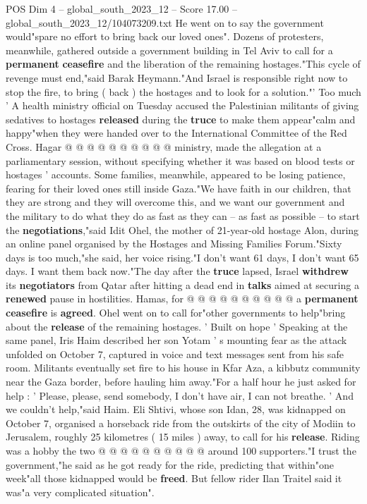 \begin{textsample}{POS Dim 4 – global\_south\_2023\_12 – Score 17.00 – global\_south\_2023\_12/104073209.txt}
He went on to say the government would"spare no effort to bring back our loved ones".
Dozens of protesters, meanwhile, gathered outside a government building in Tel Aviv to call for a \textbf{permanent} \textbf{ceasefire} and the liberation of the remaining hostages."This cycle of revenge must end,"said Barak Heymann."And Israel is responsible right now to stop the fire, to bring ( back ) the hostages and to look for a solution."' Too much ' A health ministry official on Tuesday accused the Palestinian militants of giving sedatives to hostages \textbf{released} during the \textbf{truce} to make them appear"calm and happy"when they were handed over to the International Committee of the Red Cross.
Hagar @ @ @ @ @ @ @ @ @ @ ministry, made the allegation at a parliamentary session, without specifying whether it was based on blood tests or hostages ' accounts.
Some families, meanwhile, appeared to be losing patience, fearing for their loved ones still inside Gaza."We have faith in our children, that they are strong and they will overcome this, and we want our government and the military to do what they do as fast as they can -- as fast as possible -- to start the \textbf{negotiations},"said Idit Ohel, the mother of 21-year-old hostage Alon, during an online panel organised by the Hostages and Missing Families Forum."Sixty days is too much,"she said, her voice rising."I don't want 61 days, I don't want 65 days.
I want them back now."The day after the \textbf{truce} lapsed, Israel \textbf{withdrew} its \textbf{negotiators} from Qatar after hitting a dead end in \textbf{talks} aimed at securing a \textbf{renewed} pause in hostilities.
Hamas, for @ @ @ @ @ @ @ @ @ @ a \textbf{permanent} \textbf{ceasefire} is \textbf{agreed}.
Ohel went on to call for"other governments to help"bring about the \textbf{release} of the remaining hostages. ' Built on hope ' Speaking at the same panel, Iris Haim described her son Yotam ' s mounting fear as the attack unfolded on October 7, captured in voice and text messages sent from his safe room.
Militants eventually set fire to his house in Kfar Aza, a kibbutz community near the Gaza border, before hauling him away."For a half hour he just asked for help : ' Please, please, send somebody, I don't have air, I can not breathe. ' And we couldn't help,"said Haim.
Eli Shtivi, whose son Idan, 28, was kidnapped on October 7, organised a horseback ride from the outskirts of the city of Modiin to Jerusalem, roughly 25 kilometres ( 15 miles ) away, to call for his \textbf{release}.
Riding was a hobby the two @ @ @ @ @ @ @ @ @ @ around 100 supporters."I trust the government,"he said as he got ready for the ride, predicting that within"one week"all those kidnapped would be \textbf{freed}.
But fellow rider Ilan Traitel said it was"a very complicated situation".

\end{textsample}

